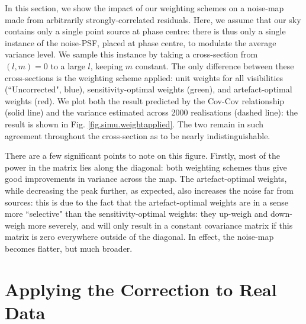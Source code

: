 \pg
In this section, we show the impact of our weighting schemes on a noise-map made from arbitrarily strongly-correlated residuals. Here, we assume that our sky contains only a single point source at phase centre: there is thus only a single instance of the noise-PSF, placed at phase centre, to modulate the average variance level. We sample this instance by taking a cross-section from $\left(l,m\right)=0$ to a large $l$, keeping $m$ constant. The only difference between these cross-sections is the weighting scheme applied: unit weights for all visibilities (``Uncorrected", blue), sensitivity-optimal weights (green), and artefact-optimal weights (red). We plot both the result predicted by the Cov-Cov relationship (solid line) and the variance estimated across 2000 realisations (dashed line): the result is shown in Fig. \ref{fig.simu.weightapplied}. The two remain in such agreement throughout the cross-section as to be nearly indistinguishable. 

\pg
There are a few significant points to note on this figure. Firstly, most of the power in the matrix lies along the diagonal: both weighting schemes thus give good improvements in variance across the map. The artefact-optimal weights, while decreasing the peak further, as expected, also increases the noise far from sources: this is due to the fact that the artefact-optimal weights are in a sense more ``selective" than the sensitivity-optimal weights: they up-weigh and down-weigh more severely, and will only result in a constant covariance matrix if this matrix is zero everywhere outside of the diagonal. {In effect, the noise-map becomes flatter, but much broader.}

\section{Applying the Correction to Real Data}


